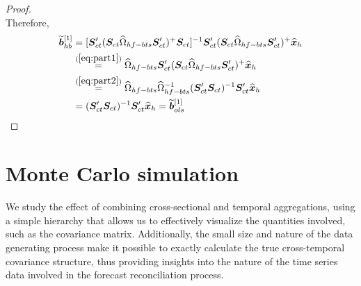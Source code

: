 \documentclass[a4paper,11pt]{article}
\newcommand{\bvet}{\bm{b}}
\newcommand{\xvet}{\bm{x}}
\newcommand{\Svet}{\bm{S}}
\theoremstyle{definition}
\begin{document}
\begin{proof}
\begin{equation}
\end{equation}
Therefore,
\begin{align*}
	\widetilde{\bvet}_{hb}^{[1]} &= [\Svet_{ct}'(\Svet_{ct}\widehat{\Omega}_{hf-bts}\Svet_{ct}')^{+}\Svet_{ct}]^{-1}\Svet_{ct}' (\Svet_{ct}\widehat{\Omega}_{hf-bts}\Svet_{ct}')^{+}\widehat{\xvet}_{h} \\ & \overset{(\ref{eq:part1})}{=} \widehat{\Omega}_{hf-bts}\Svet_{ct}' (\Svet_{ct}\widehat{\Omega}_{hf-bts}\Svet_{ct}')^{+}\widehat{\xvet}_{h}\\
	& \overset{(\ref{eq:part2})}{=} \widehat{\Omega}_{hf-bts}\widehat{\Omega}_{hf-bts}^{-1}(\Svet_{ct}'\Svet_{ct})^{-1}\Svet_{ct}' \widehat{\xvet}_{h} \\
	& = (\Svet_{ct}'\Svet_{ct})^{-1}\Svet_{ct}' \widehat{\xvet}_{h} = \widetilde{\bvet}_{ols}^{[1]} 
\end{align*}	
\end{proof}

\newpage
\section{Monte Carlo simulation}\label{sec:mcsim}

We study the effect of combining cross-sectional and temporal aggregations, using a simple hierarchy that allows us to effectively visualize the quantities involved, such as the covariance matrix. Additionally, the small size and nature of the data generating process make it possible to exactly calculate the true cross-temporal covariance structure, thus providing insights into the nature of the time series data involved in the forecast reconciliation process.
\end{document}

